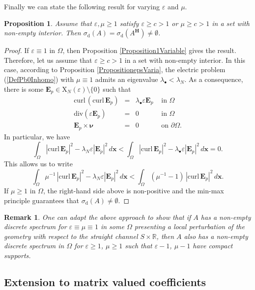 \documentclass[11pt,a4paper]{article}
\newcommand{\dsp}{\displaystyle}
\newcommand{\eps}{\varepsilon}
\newcommand{\Om}{\Omega}
\newcommand{\mrm}[1]{\mathrm{#1}}
\newcommand{\bfx}{\boldsymbol{x}}
\newcommand{\bfnu}{\boldsymbol{\nu}}
\newcommand{\R}{\mathbb{R}}
\newcommand{\mX}{\mrm{X}}
\newcommand{\curlvec}{\boldsymbol{\mrm{curl}}\,}
\renewcommand{\div}{\mrm{div}}
\def\E{\boldsymbol{E}}
\def\H{\boldsymbol{H}}
\newtheorem{remark}[theorem]{Remark}
\newtheorem{proposition}[theorem]{Proposition}
\begin{document}
\noindent Finally we can state the following result for varying $\eps$ and $\mu$.
\begin{proposition}\label{PropoDouble}
Assume that $\eps,\mu\ge1$ satisfy $\eps\ge c>1$ or $\mu\ge c>1$ in a set with non-empty interior. Then $\sigma_{\mrm{d}}(A)=\sigma_{\mrm{d}}(A^{\H})\ne\emptyset$.  
\end{proposition}
\begin{proof}
If $\eps\equiv1$ in $\Om$, then Proposition \ref{Proposition1Variable} gives the result. Therefore, let us assume that $\eps\ge c>1$ in a set with non-empty interior. In this case, according to Proposition \ref{PropositionepsVaria}, the electric problem (\ref{DefPb0Inhomo}) with $\mu\equiv1$ admits an eigenvalue $\lambda_\bullet< \lambda_N$. As a consequence, there is some $\E_p\in\boldsymbol{\mX}_N(\eps)\setminus\{0\}$ such that 
\[
\begin{array}{|rcll}
\curlvec(\curlvec\E_p)&=&\lambda_\bullet\eps\E_p&\mbox{ in }\Om\\[2pt]
\div(\eps\E_p)&=&0&\mbox{ in }\Om\\[2pt]
\E_p\times\bfnu&=&0&\mbox{ on }\partial\Om.
\end{array}
\]
In particular, we have
\[
\dsp\int_{\Om}|\curlvec\E_p|^2-\lambda_N\eps|\E_p|^2\,d\bfx< \dsp\int_{\Om}|\curlvec\E_p|^2-\lambda_\bullet\eps|\E_p|^2\,d\bfx=0.
\]
This allows us to write
\[
\dsp\int_{\Om}\mu^{-1}\,|\curlvec\E_p|^2-\lambda_N\eps|\E_p|^2\,d\bfx<\dsp\int_{\Om}(\mu^{-1}-1)\,|\curlvec\E_p|^2\,d\bfx.
\]
If $\mu\ge1$ in $\Om$, the right-hand side above is non-positive and the min-max principle guarantees that $\sigma_{\mrm{d}}(A)\ne\emptyset$. 
\end{proof}

\begin{remark}
One can adapt the above approach to show that if $A$ has a non-empty discrete spectrum for $\eps\equiv\mu\equiv1$ in some $\Om$ presenting a local perturbation of the geometry with respect to the straight channel $S\times\R$, then $A$ also has a non-empty discrete spectrum in $\Om$ for $\eps\ge1$, $\mu\ge1$ such that $\eps-1$, $\mu-1$ have compact supports. 
\end{remark}

\subsection{Extension to matrix valued coefficients}\label{ParaAniso}
\end{document}
